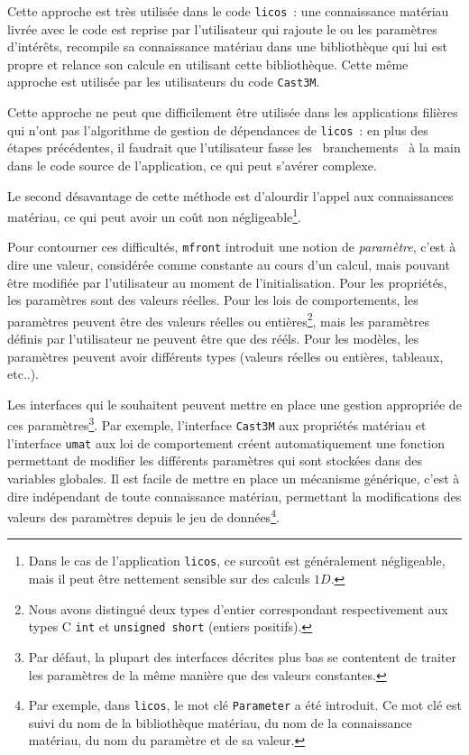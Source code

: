 \documentclass[rectoverso,pleiades,pstricks,leqno,anti]{texmf/note_technique_2010}
\newcommand{\mfront}{\texttt{mfront}}
\newcommand{\licos}{\texttt{licos}}
\newcommand{\castem}{\texttt{Cast3M}}
\newcommand{\umat}{\texttt{umat}}
\begin{document}
Cette approche est très utilisée dans le code \licos{}~: une
connaissance matériau livrée avec le code est reprise par l'utilisateur
qui rajoute le ou les paramètres d'intérêts, recompile sa connaissance
matériau dans une bibliothèque qui lui est propre et relance son calcule
en utilisant cette bibliothèque. Cette même approche est utilisée par
les utilisateurs du code \castem{}.

Cette approche ne peut que difficilement être utilisée dans les
applications filières qui n'ont pas l'algorithme de gestion de
dépendances de \licos{}~: en plus des étapes précédentes, il faudrait
que l'utilisateur fasse les \og~branchements~\fg{} à la main dans le
code source de l'application, ce qui peut s'avérer complexe.

Le second désavantage de cette méthode est d'alourdir l'appel aux
connaissances matériau, ce qui peut avoir un coût non
négligeable\footnote{Dans le cas de l'application \licos{}, ce surcoût
  est généralement négligeable, mais il peut être nettement sensible sur
  des calculs \(1D\).}.

Pour contourner ces difficultés, \mfront{} introduit une notion de
{\em paramètre}, c'est à dire une valeur, considérée comme constante au
cours d'un calcul, mais pouvant être modifiée par l'utilisateur au
moment de l'initialisation. Pour les propriétés, les paramètres sont des
valeurs réelles. Pour les lois de comportements, les paramètres peuvent
être des valeurs réelles ou entières\footnote{Nous avons distingué deux
  types d'entier correspondant respectivement aux types C {\tt int} et
  {\tt unsigned short} (entiers positifs).}, mais les paramètres définis
par l'utilisateur ne peuvent être que des rééls. Pour les modèles, les
paramètres peuvent avoir différents types (valeurs réelles ou entières,
tableaux, etc..).

Les interfaces qui le souhaitent peuvent mettre en place une gestion
appropriée de ces paramètres\footnote{Par défaut, la plupart des
  interfaces décrites plus bas se contentent de traiter les paramètres
  de la même manière que des valeurs constantes.}. Par exemple,
l'interface \castem{} aux propriétés matériau et l'interface \umat{} aux
loi de comportement créent automatiquement une fonction permettant de
modifier les différents paramètres qui sont stockées dans des variables
globales. Il est facile de mettre en place un mécanisme générique, c'est
à dire indépendant de toute connaissance matériau, permettant la
modifications des valeurs des paramètres depuis le jeu de
données\footnote{Par exemple, dans \licos{}, le mot clé {\tt Parameter}
  a été introduit. Ce mot clé est suivi du nom de la bibliothèque
  matériau, du nom de la connaissance matériau, du nom du paramètre et
  de sa valeur.}.
\end{document}
